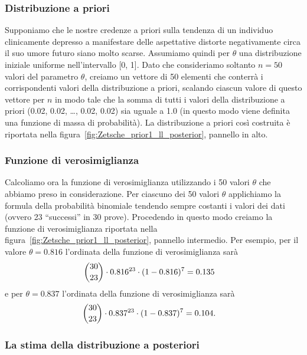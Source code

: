 \subsubsection{Distribuzione a priori}

Supponiamo che le nostre credenze a priori sulla tendenza di un individuo clinicamente depresso a manifestare delle aspettative distorte negativamente circa il suo umore futuro siano molto scarse.
Assumiamo quindi per $\theta$ una distribuzione iniziale uniforme nell'intervallo [0, 1].
Dato che consideriamo soltanto $n = 50$ valori del parametro $\theta$, creiamo un vettore di 50 elementi che conterrà i corrispondenti valori della distribuzione a priori, scalando ciascun valore di questo vettore per $n$ in modo tale che la somma di tutti i valori della distribuzione a priori (0.02, 0.02, \dots, 0.02, 0.02) sia uguale a 1.0 (in questo modo viene definita una funzione di massa di probabilità).
La distribuzione a priori così costruita è riportata nella figura~\ref{fig:Zetsche_prior1_ll_posterior}, pannello in alto.

\subsubsection{Funzione di verosimiglianza}

Calcoliamo ora la funzione di verosimiglianza utilizzando i 50 valori $\theta$ che abbiamo preso in considerazione.
Per ciascuno dei 50 valori $\theta$ applichiamo la formula della probabilità binomiale tendendo sempre costanti i valori dei dati (ovvero 23 \enquote{successi} in 30 prove).
Procedendo in questo modo creiamo la funzione di verosimiglianza riportata nella  figura~\ref{fig:Zetsche_prior1_ll_posterior}, pannello intermedio.
Per esempio, per il valore $\theta = 0.816$ l'ordinata della funzione di verosimiglianza sarà
\begin{align}
\binom{30}{23}& \cdot 0.816^{23} \cdot (1 - 0.816)^{7} = 0.135\notag
\end{align}
e per $\theta = 0.837$ l'ordinata della funzione di verosimiglianza sarà
\begin{align}
\binom{30}{23}& \cdot 0.837^{23} \cdot (1 - 0.837)^{7} = 0.104.\notag
\end{align}

\subsubsection{La stima della distribuzione a posteriori}

